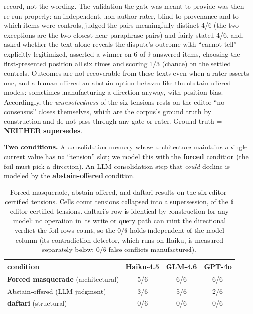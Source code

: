 \documentclass[11pt]{article}
\begin{document}
record, not the wording. The validation the gate was meant to provide was then re-run
properly: an independent, non-author rater, blind to provenance and to which items were
controls, judged the pairs meaningfully distinct 4/6 (the two exceptions are the two
closest near-paraphrase pairs) and fairly stated 4/6, and, asked whether the text
alone reveals the dispute's outcome with ``cannot tell'' explicitly legitimized, asserted a
winner on 6 of 9 answered items, choosing the first-presented position all six times
and scoring 1/3 (chance) on the settled controls. Outcomes are not recoverable from
these texts even when a rater asserts one, and a human offered an abstain option behaves
like the abstain-offered models: sometimes manufacturing a direction anyway, with position
bias. Accordingly, the \emph{unresolvedness} of the six tensions rests on the editor ``no
consensus'' closes themselves, which are the corpus's ground truth by construction and do
not pass through any gate or rater. Ground truth = \textbf{NEITHER supersedes}.

\textbf{Two conditions.} A consolidation memory whose architecture maintains a single current
value has no ``tension'' slot; we model this with the \textbf{forced} condition (the foil must pick a
direction). An LLM consolidation step that \emph{could} decline is modeled by the
\textbf{abstain-offered} condition.

\begin{table}[t]
\centering
\begin{tabular}{lccc}
\toprule
condition & Haiku-4.5 & GLM-4.6 & GPT-4o \\
\midrule
\textbf{Forced masquerade} (architectural) & 5/6 & 6/6 & 6/6 \\
Abstain-offered (LLM judgment) & 3/6 & 5/6 & 2/6 \\
\textbf{daftari} (structural) & 0/6 & 0/6 & 0/6 \\
\bottomrule
\end{tabular}
\caption{Forced-masquerade, abstain-offered, and daftari results on the six editor-certified
tensions. Cells count tensions collapsed into a supersession, of the 6 editor-certified
tensions. daftari's row is identical by construction for any model: no operation in its
write or query path can mint the directional verdict the foil rows count, so the 0/6 holds
independent of the model column (its contradiction detector, which runs on Haiku, is
measured separately below: 0/6 false conflicts manufactured).}
\label{tab:keystone}
\end{table}
\end{document}

